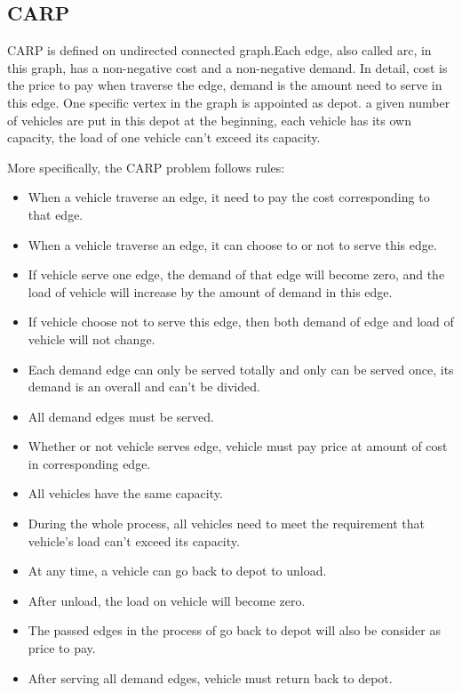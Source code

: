 \documentclass[journal]{IEEEtran}
\begin{document}
	
	\subsection{CARP}
	CARP is defined on undirected connected graph.Each edge, also called arc, in this graph, has a non-negative cost and a non-negative demand. In detail, cost is the price to pay when traverse the edge, demand is the amount need to serve in this edge. One specific vertex in the graph is appointed as depot. a given number of vehicles are put in this depot at the beginning, each vehicle has its own capacity, the load of one vehicle can't exceed its capacity.
	
	More specifically, the CARP problem follows rules:
	
	\begin{itemize}
		\item When a vehicle traverse an edge, it need to pay the cost corresponding to that edge.
		\item When a vehicle traverse an edge, it  can choose to or not to serve this edge.
		\item If vehicle serve one edge, the demand of that edge will become zero, and the load of vehicle will increase by the amount of demand in this edge.
		\item If vehicle choose not to serve this edge, then both demand of edge and load of vehicle will not change.
		\item Each demand edge can only be served totally and only can be served once, its demand is an overall and can't be divided.
		\item All demand edges must be served.
		\item Whether or not vehicle serves edge, vehicle must pay price at amount of cost in corresponding edge.
		\item All vehicles have the same capacity.
		\item During the whole process, all vehicles need to meet the requirement that vehicle's load can't exceed its capacity.
		\item At any time, a vehicle can go back to depot to unload.
		\item After unload, the load on vehicle will become zero.
		\item The passed edges in the process of go back to depot will also be consider as price to pay.
		\item After serving all demand edges, vehicle must return back to depot.
	\end{itemize}
\end{document}
